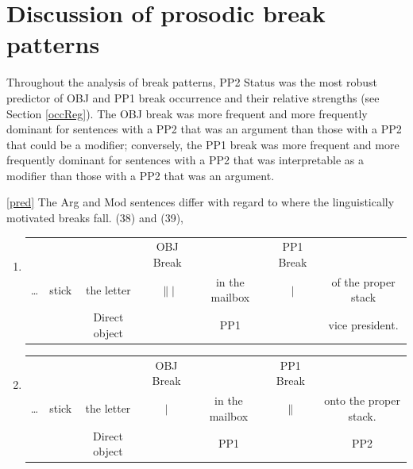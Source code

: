 \documentclass[12pt,oneside]{book}
\providecommand{\tightlist}{%
  \setlength{\itemsep}{0pt}\setlength{\parskip}{0pt}}
\begin{document}
\hypertarget{discussion-of-prosodic-break-patterns}{%
\section{Discussion of prosodic break patterns}\label{discussion-of-prosodic-break-patterns}}

Throughout the analysis of break patterns, PP2 Status was the most robust predictor of OBJ and PP1 break occurrence and their relative strengths (see Section \ref{occReg}). The OBJ break was more frequent and more frequently dominant for sentences with a PP2 that was an argument than those with a PP2 that could be a modifier; conversely, the PP1 break was more frequent and more frequently dominant for sentences with a PP2 that was interpretable as a modifier than those with a PP2 that was an argument.

 \ref{pred} The Arg and Mod sentences differ with regard to where the linguistically motivated breaks fall.  (38) and (39), 

\singlespacing

\begin{enumerate}
\def\labelenumi{(\arabic{enumi})}
\setcounter{enumi}{37}
\tightlist
\item
  \begingroup
  \setlength{\tabcolsep}{1pt}

  \begin{tabular}{ccccccc}
    & & & \small OBJ Break & & \small PP1 Break & \\
    \dots & stick & the letter & $\||$ & in the mailbox & $\vert$ & of the proper stack \\
    & & \footnotesize Direct object & & \footnotesize PP1 & & \footnotesize vice president. \\
  \end{tabular}
    \endgroup
\item
  \begingroup
  \setlength{\tabcolsep}{1pt}

  \begin{tabular}{ccccccc}
    & & & \small OBJ Break & & \small PP1 Break & \\
    \dots & stick & the letter & $\vert$ & in the mailbox & $\|$ & onto the proper stack. \\
    & & \footnotesize Direct object & & \footnotesize PP1 & & \footnotesize PP2 \\
  \end{tabular}
    \endgroup
\end{enumerate}
\end{document}
